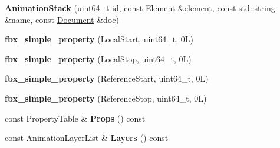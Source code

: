 \begin{DoxyCompactItemize}
\item 
\hypertarget{class_assimp_1_1_f_b_x_1_1_animation_stack_a6c283fdd641cbe43291010af8b128383}{{\bfseries Animation\+Stack} (uint64\+\_\+t id, const \hyperlink{class_assimp_1_1_f_b_x_1_1_element}{Element} \&element, const std\+::string \&name, const \hyperlink{class_assimp_1_1_f_b_x_1_1_document}{Document} \&doc)}\label{class_assimp_1_1_f_b_x_1_1_animation_stack_a6c283fdd641cbe43291010af8b128383}

\item 
\hypertarget{class_assimp_1_1_f_b_x_1_1_animation_stack_a8675d61ef10b738cc9435df710f3e848}{{\bfseries fbx\+\_\+simple\+\_\+property} (Local\+Start, uint64\+\_\+t, 0\+L)}\label{class_assimp_1_1_f_b_x_1_1_animation_stack_a8675d61ef10b738cc9435df710f3e848}

\item 
\hypertarget{class_assimp_1_1_f_b_x_1_1_animation_stack_a4b1b35eb6e469efa35b0a046229c2a3b}{{\bfseries fbx\+\_\+simple\+\_\+property} (Local\+Stop, uint64\+\_\+t, 0\+L)}\label{class_assimp_1_1_f_b_x_1_1_animation_stack_a4b1b35eb6e469efa35b0a046229c2a3b}

\item 
\hypertarget{class_assimp_1_1_f_b_x_1_1_animation_stack_a91d19fd97f2fc4008851c232a4137b23}{{\bfseries fbx\+\_\+simple\+\_\+property} (Reference\+Start, uint64\+\_\+t, 0\+L)}\label{class_assimp_1_1_f_b_x_1_1_animation_stack_a91d19fd97f2fc4008851c232a4137b23}

\item 
\hypertarget{class_assimp_1_1_f_b_x_1_1_animation_stack_ae1b1c3a3541b95e3eb5b5e41fe717f52}{{\bfseries fbx\+\_\+simple\+\_\+property} (Reference\+Stop, uint64\+\_\+t, 0\+L)}\label{class_assimp_1_1_f_b_x_1_1_animation_stack_ae1b1c3a3541b95e3eb5b5e41fe717f52}

\item 
\hypertarget{class_assimp_1_1_f_b_x_1_1_animation_stack_a48740b804b7bcf39bfa480b02dfdcd59}{const Property\+Table \& {\bfseries Props} () const }\label{class_assimp_1_1_f_b_x_1_1_animation_stack_a48740b804b7bcf39bfa480b02dfdcd59}

\item 
\hypertarget{class_assimp_1_1_f_b_x_1_1_animation_stack_a9f13eb158d813bb9e769d656ed7e007b}{const Animation\+Layer\+List \& {\bfseries Layers} () const }\label{class_assimp_1_1_f_b_x_1_1_animation_stack_a9f13eb158d813bb9e769d656ed7e007b}

\end{DoxyCompactItemize}

